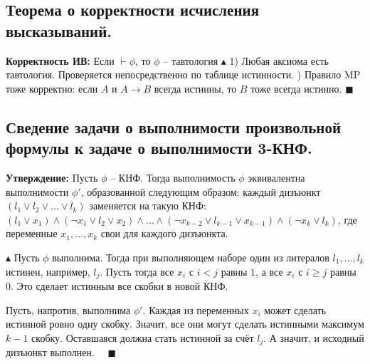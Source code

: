 \subsection{Теорема о корректности исчисления высказываний.}
\textbf{Корректность ИВ:} Если $\vdash \phi$, то $\phi$ -- тавтология
\newline $\blacktriangle$ 1) Любая аксиома есть тавтология. Проверяется непосредственно по таблице истинности. 
) Правило MP тоже корректно: если $A$ и $A \to B$ всегда истинны, то $B$ тоже всегда истинно. $ \blacksquare$

\subsection{Сведение задачи о выполнимости произвольной формулы к задаче о выполнимости 3-КНФ.}
\textbf{Утверждение:} Пусть $\phi$ -- КНФ. Тогда выполнимость $\phi$ эквивалентна выполнимости $\phi'$, образованной следующим образом: каждый дизъюнкт $(l_1 \lor l_2 \lor \ldots \lor l_k)$ заменяется на такую КНФ: $(l_1 \lor x_1) \land (\neg x_1 \lor l_2 \lor x_2) \land\ldots\land (\neg x_{k-2} \lor l_{k-1} \lor x_{k-1}) \land (\neg x_k \lor l_k)$, где переменные $x_1, \ldots, x_k$ свои для каждого дизъюнкта.

$\blacktriangle$ Пусть $\phi$ выполнима. Тогда при выполняющем наборе один из литералов $l_1, \ldots, l_k$ истинен, например, $l_j$. Пусть тогда все $x_i$ с $i < j$ равны $1$, а все $x_i$ с $i \geqslant j$ равны $0$. Это сделает истинным все скобки в новой КНФ.

Пусть, напротив, выполнима $\phi'$. Каждая из переменных $x_i$ может сделать истинной ровно одну скобку. Значит, все они могут сделать истинными максимум $k - 1$ скобку. Оставшаяся должна стать истинной за счёт $l_j$. А значит, и исходный дизъюнкт выполнен. $\quad \blacksquare$



